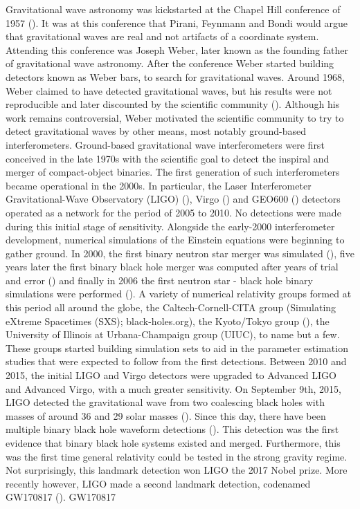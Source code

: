 Gravitational wave astronomy was kickstarted at the Chapel Hill conference of 1957 (\citet*{dewitt1957conference}). It was at this conference that Pirani, Feynmann and Bondi would argue that gravitational waves are real and not artifacts of a coordinate system. Attending this conference was Joseph Weber, later known as the founding father of gravitational wave astronomy. After the conference Weber started building detectors known as Weber bars, to search for gravitational waves. Around 1968, Weber claimed to have detected gravitational waves, but his results were not reproducible and later discounted by the scientific community (\cite{thorne1994black}). Although his work remains controversial, Weber motivated the scientific community to try to detect gravitational waves by other means, most notably ground-based interferometers. Ground-based gravitational wave interferometers were
first conceived in the late 1970s with the scientific goal to detect the inspiral and merger of compact-object binaries. The first generation of such interferometers became operational in the 2000s. In particular, the Laser Interferometer Gravitational-Wave Observatory (LIGO) (\citet*{ligo2018gwtc}), Virgo (\citet*{acernese2015advanced}) and GEO600 (\citet*{affeldt2014advanced}) detectors operated as a network for the period of 2005 to 2010. No detections were made during this initial stage of sensitivity.
Alongside the early-2000 interferometer development, numerical simulations of the Einstein equations were beginning to gather ground. In 2000, the first binary neutron star merger was simulated (\citet*{shibata2000simulation}), five years later the first binary black hole merger was computed after years of trial and error (\citet*{pretorius2005a}) and finally in 2006 the first neutron star - black hole binary simulations were performed (\citet*{shibata2006merger}). A variety of numerical relativity groups formed at this period all around the globe, the Caltech-Cornell-CITA group (Simulating eXtreme Spacetimes (SXS); black-holes.org), the Kyoto/Tokyo group (\citet*{nagakura:2014hza}), the University of Illinois at Urbana-Champaign group (UIUC), to name but a few. These groups started building simulation sets to aid in the parameter estimation studies that were expected to follow from the first detections.
Between 2010 and 2015, the initial LIGO and Virgo detectors were upgraded to Advanced LIGO and Advanced Virgo, with a much greater sensitivity. On September 9th, 2015, LIGO detected the gravitational wave from two coalescing black holes with masses of around 36 and 29 solar masses (\citet*{theligoscientific:2016wfe}). Since this day, there have been multiple binary black hole waveform detections (\citet*{ligo2018gwtc}). This detection was the first evidence that binary black hole systems existed and merged. Furthermore, this was the first time general relativity could be tested in the strong gravity regime. Not surprisingly, this landmark detection won LIGO the 2017 Nobel prize. More recently however, LIGO made a second landmark detection, codenamed GW170817 (\cite{abbott2017gw170817}).  GW170817
